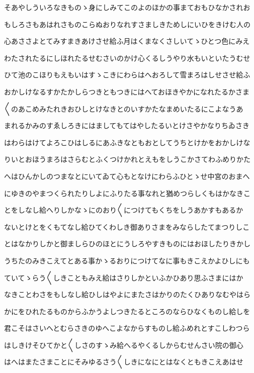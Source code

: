 \documentclass[a4paper,11pt,landscape]{ltjtarticle}
\begin{document}
そあやしういろなきものゝ身にしみてこのよのほかの事まておもひなかされお
\par\medskip
もしろさもあはれさものこらぬおりなれすさましきためしにいひをきけむ人の
\par\medskip
心あささよとてみすまきあけさせ給ふ月はくまなくさしいてゝひとつ色にみえ
\par\medskip
わたされたるにしほれたるせむさいのかけ心くるしうやり水もいといたうむせ
\par\medskip
ひて池のこほりもえもいはすゝこきにわらはへおろして雪まろはしせさせ給ふ
\par\medskip
おかしけなるすかたかしらつきともつきにはへておほきやかになれたるかさま
\par\medskip
〱のあこめみたれきおひしとけなきとのいすかたなまめいたるにこよなうあ
\par\medskip
まれるかみのすゑしろきにはましてもてはやしたるいとけさやかなりちゐさき
\par\medskip
はわらはけてよろこひはしるにあふきなともおとしてうちとけかをおかしけな
\par\medskip
りいとおほうまろはさらむとふくつけかれとえもをしうこかさてわふめりかた
\par\medskip
へはひんかしのつまなとにいてゐて心もとなけにわらふひとゝせ中宮のおまへ
\par\medskip
にゆきのやまつくられたりしよにふりたる事なれと猶めつらしくもはかなきこ
\par\medskip
とをしなし給へりしかなゝにのおり〱につけてもくちをしうあかすもあるか
\par\medskip
ないとけとをくもてなし給ひてくわしき御ありさまをみならしたてまつりしこ
\par\medskip
とはなかりしかと御ましらひのほとにうしろやすきものにはおほしたりきかし
\par\medskip
うちたのみきこえてとある事かゝるおりにつけてなに事もきこえかよひしにも
\par\medskip
ていてゝらう〱しきこともみえ給はさりしかといふかひあり思ふさまにはか
\par\medskip
なきことわさをもしなし給ひしはやよにまたさはかりのたくひありなむやはら
\par\medskip
かにをひれたるものからふかうよしつきたるところのならひなくものし給しを
\par\medskip
君こそはさいへとむらさきのゆへこよなからすものし給ふめれとすこしわつら
\par\medskip
はしきけそひてかと〱しさのすゝみ給へるやくるしからむせんさい院の御心
\par\medskip
はへはまたさまことにそみゆるさう〱しきになにとはなくともきこえあはせ
\end{document}
